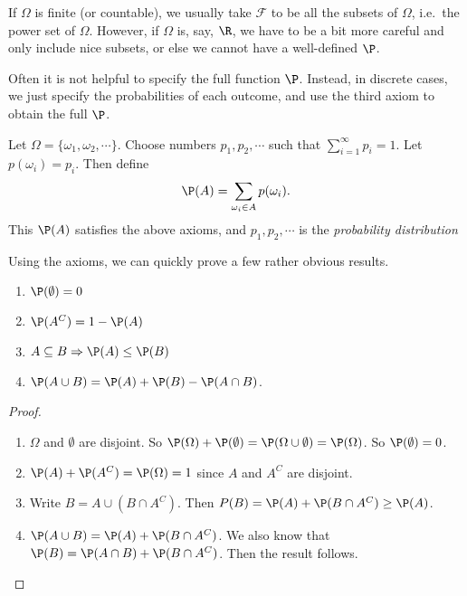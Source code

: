 \documentclass[a4paper]{article}
\begin{document}
If $\Omega$ is finite (or countable), we usually take $\mathcal{F}$ to be all the subsets of $\Omega$, i.e.\ the power set of $\Omega$. However, if $\Omega$ is, say, $\R$, we have to be a bit more careful and only include nice subsets, or else we cannot have a well-defined $\P$.

Often it is not helpful to specify the full function $\P$. Instead, in discrete cases, we just specify the probabilities of each outcome, and use the third axiom to obtain the full $\P$.

\begin{defi}
  Let $\Omega = \{\omega_1, \omega_2, \cdots\}$. Choose numbers $p_1, p_2, \cdots $ such that $\sum_{i = 1}^\infty p_i= 1$. Let $p(\omega_i) = p_i$. Then define
  \[
    \P(A) = \sum_{\omega_i\in A} p(\omega_i).
  \]
  This $\P(A)$ satisfies the above axioms, and $p_1, p_2, \cdots$ is the \emph{probability distribution}
\end{defi}

Using the axioms, we can quickly prove a few rather obvious results.
\begin{thm}\leavevmode
  \begin{enumerate}
    \item $\P(\emptyset) = 0$
    \item $\P(A^C) = 1 - \P(A)$
    \item $A\subseteq B \Rightarrow \P(A) \leq \P(B)$
    \item $\P (A\cup B) = \P(A) + \P(B) - \P(A\cap B)$.
  \end{enumerate}
\end{thm}

\begin{proof}\leavevmode
  \begin{enumerate}
    \item $\Omega$ and $\emptyset$ are disjoint. So $\P(\Omega) + \P(\emptyset) = \P(\Omega \cup \emptyset) = \P(\Omega)$. So $\P(\emptyset) = 0$.
    \item $\P(A) + \P(A^C) = \P(\Omega) = 1$ since $A$ and $A^C$ are disjoint.
    \item Write $B = A\cup (B\cap A^C)$. Then $\\P(B) = \P(A) + \P(B\cap A^C) \geq \P(A)$.
    \item $\P(A\cup B) = \P(A) + \P(B\cap A^C)$. We also know that $\P(B) = \P(A\cap B) + \P(B\cap A^C)$. Then the result follows.\qedhere
  \end{enumerate}
\end{proof}
\end{document}
